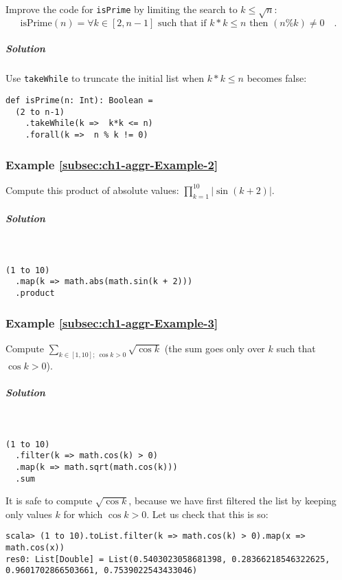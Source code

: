 Improve the code for \lstinline!isPrime! by limiting the search to
$k\leq\sqrt{n}$:
\[
\text{isPrime}\left(n\right)=\forall k\in\left[2,n-1\right]\text{ such that if }k*k\leq n\text{ then }(n\%k)\neq0\quad.
\]


\subparagraph{Solution}

Use \lstinline!takeWhile! to truncate the initial list when $k*k\leq n$
becomes false:
\begin{lstlisting}
def isPrime(n: Int): Boolean =
  (2 to n-1)
    .takeWhile(k =>  k*k <= n)
    .forall(k =>  n % k != 0)
\end{lstlisting}


\subsubsection{Example \label{subsec:ch1-aggr-Example-2}\ref{subsec:ch1-aggr-Example-2}}

Compute this product of absolute values: $\prod_{k=1}^{10}\left|\sin\left(k+2\right)\right|$.

\subparagraph{Solution}

~
\begin{lstlisting}
(1 to 10)
  .map(k => math.abs(math.sin(k + 2)))
  .product
\end{lstlisting}


\subsubsection{Example \label{subsec:ch1-aggr-Example-3}\ref{subsec:ch1-aggr-Example-3}}

Compute $\sum_{k\in[1,10];~\cos k>0}\sqrt{\cos k}$ (the sum goes
only over $k$ such that $\cos k>0$).

\subparagraph{Solution}

~

\begin{lstlisting}
(1 to 10)
  .filter(k => math.cos(k) > 0)
  .map(k => math.sqrt(math.cos(k)))
  .sum
\end{lstlisting}
It is safe to compute $\sqrt{\cos k}$, because we have first filtered
the list by keeping only values $k$ for which $\cos k>0$. Let us
check that this is so:
\begin{lstlisting}
scala> (1 to 10).toList.filter(k => math.cos(k) > 0).map(x => math.cos(x))
res0: List[Double] = List(0.5403023058681398, 0.28366218546322625, 0.9601702866503661, 0.7539022543433046)
\end{lstlisting}


